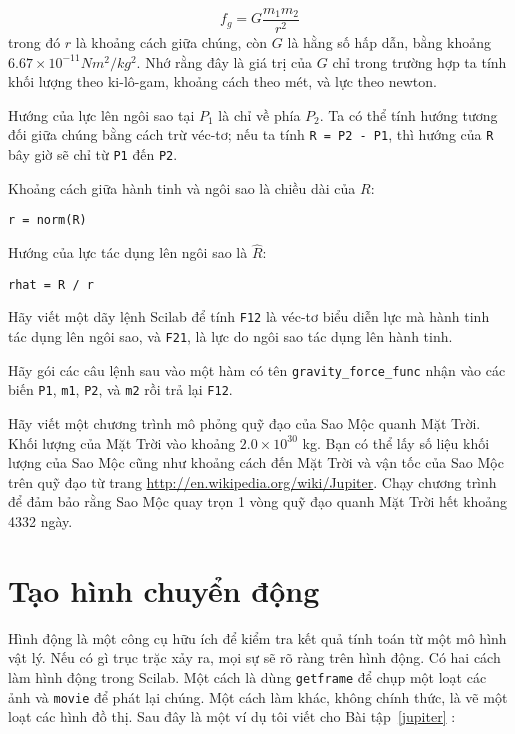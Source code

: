 \documentclass[12pt]{book}
\begin{document}
\[ f_g = G \frac{m_1 m_2}{r^2}  \]
%
trong đó $r$ là khoảng cách giữa chúng, còn $G$ là hằng số hấp dẫn,
bằng khoảng $6.67 \times 10^{-11} N m^2 /
kg^2$.  Nhớ rằng đây là giá trị của $G$ chỉ trong trường hợp ta tính 
khối lượng theo ki-lô-gam, khoảng cách theo mét, và lực theo newton.

Hướng của lực lên ngôi sao tại $P_1$ là chỉ về phía $P_2$. Ta có thể 
tính hướng tương đối giữa chúng bằng cách trừ véc-tơ; nếu ta tính 
{\tt R = P2 - P1}, thì hướng của {\tt R} bây giờ sẽ chỉ từ {\tt P1} đến {\tt P2}.

Khoảng cách giữa hành tinh và ngôi sao là chiều dài của $R$:

\begin{verbatim}
r = norm(R)
\end{verbatim}
%
Hướng của lực tác dụng lên ngôi sao là $\hat{R}$:

\begin{verbatim}
rhat = R / r
\end{verbatim}

\begin{ex}
Hãy viết một dãy lệnh Scilab để tính {\tt F12} là véc-tơ biểu diễn 
lực mà hành tinh tác dụng lên ngôi sao, và {\tt F21}, là lực do 
ngôi sao tác dụng lên hành tinh.
\end{ex}

\begin{ex}
Hãy gói các câu lệnh sau vào một hàm có tên \verb#gravity_force_func#
nhận vào các biến {\tt P1}, {\tt m1}, {\tt P2}, và {\tt m2} rồi trả lại {\tt F12}.
\end{ex}

\begin{ex}
\label{jupiter}
Hãy viết một chương trình  mô phỏng quỹ đạo của Sao Mộc quanh
Mặt Trời. Khối lượng của Mặt Trời vào khoảng $2.0 \times 10^{30}$ kg. 
Bạn có thể lấy số liệu khối lượng của Sao Mộc cũng như khoảng cách
đến Mặt Trời và vận tốc của Sao Mộc trên quỹ đạo từ trang 
\url{http://en.wikipedia.org/wiki/Jupiter}. Chạy chương trình để
đảm bảo rằng Sao Mộc quay trọn 1 vòng quỹ đạo quanh Mặt Trời
hết khoảng 4332 ngày.
\end{ex}


\section{Tạo hình chuyển động}

Hình động là một công cụ hữu ích để kiểm tra kết quả tính toán từ
một mô hình vật lý. Nếu có gì trục trặc xảy ra, mọi sự sẽ rõ ràng
trên hình động. Có hai cách làm hình động trong Scilab. Một cách
là dùng {\tt getframe} để chụp một loạt các ảnh và {\tt movie} để
phát lại chúng. Một cách làm khác, không chính thức, là vẽ một loạt
các hình đồ thị. Sau đây là một ví dụ tôi viết cho Bài tập~\ref{jupiter} :
\end{document}
